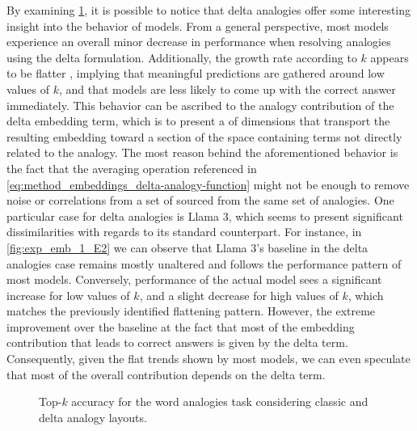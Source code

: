By examining \cref{fig:exp_emb_1_E}, it is possible to notice that delta analogies offer some interesting insight into the behavior of models.
From a general perspective, most models experience an overall minor decrease in performance when resolving analogies using the delta formulation.
Additionally, the growth rate according to $k$ appears to be flatter , implying that meaningful predictions are gathered around low values of $k$, and that models are less likely to come up with the correct answer  immediately.
This behavior can be ascribed to the analogy contribution of the delta embedding term, which is  to present a  of dimensions that transport the resulting embedding toward a section of the space containing terms not directly related to the analogy.
The most  reason behind the aforementioned behavior is the fact that the averaging operation referenced in \cref{eq:method_embeddings_delta-analogy-function} might not be enough to remove noise or  correlations from a set of  sourced from the same set of analogies.
One particular case for delta analogies is Llama 3, which seems to present significant dissimilarities with regards to its standard counterpart.
For instance, in \cref{fig:exp_emb_1_E2} we can observe that Llama 3's baseline in the delta analogies case remains mostly unaltered and follows the performance pattern of most models.
Conversely,  performance of the actual model sees a significant increase for low values of $k$, and a slight decrease for high values of $k$, which matches the previously identified flattening pattern.
However, the extreme improvement over the baseline  at the fact that most of the embedding contribution that leads to correct answers is given by the delta term.
Consequently, given the flat trends shown by most models, we can even speculate that most of the overall contribution depends on the delta term.

\begin{figure}[t!]
    \centering
    \caption{Top-$k$ accuracy for the word analogies task considering classic and delta analogy layouts.}
    \label{fig:exp_emb_1_E}
\end{figure}

